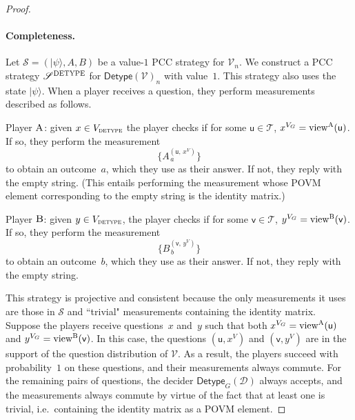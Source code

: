 \documentclass[11pt]{article}
\theoremstyle{definition}
\newcommand{\ket}[1]{|#1\rangle}
\newcommand{\decider}{\mathcal{D}}
\newcommand{\verifier}{\mathcal{V}}
\newcommand{\strategy}{\mathscr{S}}
\newcommand{\type}{\mathcal{T}}
\newcommand{\gamestyle}[1]{\ensuremath{\textsc{#1}}\xspace}
\newcommand{\labelstyle}[1]{\ensuremath{\textsc{#1}}\xspace}
\newcommand{\tvarstyle}[1]{\mathsf{#1}}
\newcommand{\lvar}{\ensuremath{\tvarstyle{u}}}
\newcommand{\rvar}{\ensuremath{\tvarstyle{v}}}
\newcommand{\alice}{\labelstyle{A}}
\newcommand{\bob}{\labelstyle{B}}
\newcommand{\tmstyle}[1]{\ensuremath{\mathsf{#1}}}
\newcommand{\detype}{\tmstyle{Detype}}
\begin{document}
\begin{proof}
\paragraph{Completeness.}
Let $\strategy = (\ket{\psi},A, B)$ be a value-$1$ PCC strategy for
$\verifier_n$.
We construct a PCC strategy $\strategy^{\gamestyle{DETYPE}}$ for
$\detype(\verifier)_n$ with value~$1$.
This strategy also uses the state $\ket{\psi}$. 
When a player receives a question, they perform measurements described as
follows.
\begin{description}
\item Player \alice: given $x \in V_{\gamestyle{detype}}$ the player checks if
  for some $\lvar \in \type$, $x^{V_G} = \mathrm{view}^\alice(\lvar)$.
	If so, they perform the
  measurement
  \begin{equation*}
    \Big\{ A^{(\lvar,\, x^V)}_{\, a} \Big\}
  \end{equation*}
  to obtain an outcome~$a$, which they use as their answer.
	If not, they reply with the empty string.
	(This entails performing the measurement whose POVM element corresponding to
  the empty string is the identity matrix.)
\item Player \bob: given $y \in V_{\gamestyle{detype}}$, the player checks if
  for some $\rvar \in \type$, $y^{V_G} = \mathrm{view}^\bob(\rvar)$.
	If so, they perform the measurement
  \begin{equation*}
    \Big\{ B^{(\rvar,\, y^V)}_{\, b} \Big\}
  \end{equation*}
  to obtain an outcome~$b$, which they use as their answer.
	If not, they reply with the empty string.
\end{description}
This strategy is projective and consistent because the only measurements it uses
are those in $\strategy$ and ``trivial" measurements containing the identity
matrix.
Suppose the players receive questions~$x$ and~$y$ such that both $x^{V_G} =
\mathrm{view}^\alice(\lvar)$ and $y^{V_G} = \mathrm{view}^\bob(\rvar)$.
In this case, the questions $(\lvar, x^{V})$ and $(\rvar, y^{V})$ are in the
support of the question distribution of $\verifier$.
As a result, the players succeed with probability~$1$ on these questions, and
their measurements always commute.
For the remaining pairs of questions, the decider $\detype_G(\decider)$ always
accepts, and the measurements always commute by virtue of the fact that at least
one is trivial, i.e.\ containing the identity matrix as a POVM element.


\end{proof}
\end{document}
